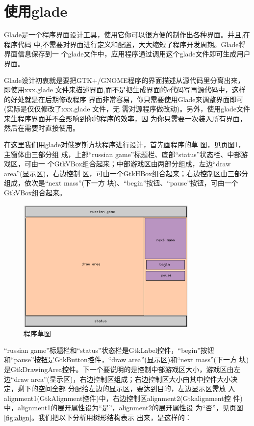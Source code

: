 

\section{使用glade}

Glade是一个程序界面设计工具，使用它你可以很方便的制作出各种界面。并且,在程序代码
中,不需要对界面进行定义和配置，大大缩短了程序开发周期。Glade将界面信息保存到一
个glade文件中，应用程序通过调用这个glade文件即可生成用户界面。

Glade设计初衷就是要把GTK+/GNOME程序的界面描述从源代码里分离出来，即使用xxx.glade
文件来描述界面,而不是把生成界面的c代码写再源代码中，这样的好处就是在后期修改程序
界面非常容易，你只需要使用Glade来调整界面即可(实际是仅仅修改了xxx.glade 文件，无
需对源程序做改动)。另外，使用glade文件来生程序界面并不会影响到你的程序的效率，因
为你只需要一次装入所有界面，然后在需要时直接使用。

在这里我们用glade对俄罗斯方块程序进行设计，首先画程序的草
图，见\pageref{fig:interface}页图\ref{fig:interface}，主窗体由三部分组
成，上部``russian game''标题栏、底部``status''状态栏、中部游戏区，可由一
个GtkVBox组合起来；中部游戏区由两部分组成，左边``draw area''(显示区)，右边控制
区，可由一个GtkHBox组合起来；右边控制区由三部分组成，依次是``next mass''(下一方
块)、``begin''按钮、``pause''按钮，可由一个GtkVBox组合起来。

\begin{figure}[htbp]
  \centering
  \includegraphics[width=3.5in]{images/interface}
  \caption{程序草图}
  \label{fig:interface}
\end{figure}

``russian game''标题栏和``status''状态栏是GtkLabel控件，``begin''按钮
和``pause''按钮是GtkButton控件，``draw area''(显示区)和``next mass''(下一方
块)是GtkDrawingArea控件。下一个要说明的是控制中部游戏区大小，游戏区由左边``draw
area''(显示区)，右边控制区组成；右边控制区大小由其中控件大小决定，剩下的空间全部
分配给左边的显示区，要达到目的，左边显示区需放
入alignment1(GtkAlignment控件)中，右边控制区alignment2(Gtkalignment控
件)中，alignment1的展开属性设为``是''，alignment2的展开属性设
为``否''，见\pageref{fig:align}页图\ref{fig:align}。我们把以下分析用树形结构表示
出来，是这样的：

